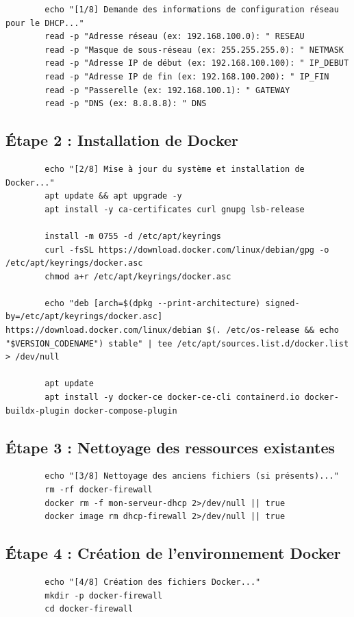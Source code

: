 	\begin{lstlisting}
		echo "[1/8] Demande des informations de configuration réseau pour le DHCP..."
		read -p "Adresse réseau (ex: 192.168.100.0): " RESEAU
		read -p "Masque de sous-réseau (ex: 255.255.255.0): " NETMASK
		read -p "Adresse IP de début (ex: 192.168.100.100): " IP_DEBUT
		read -p "Adresse IP de fin (ex: 192.168.100.200): " IP_FIN
		read -p "Passerelle (ex: 192.168.100.1): " GATEWAY
		read -p "DNS (ex: 8.8.8.8): " DNS
	\end{lstlisting}
	
	\subsection*{Étape 2 : Installation de Docker}
	\begin{lstlisting}
		echo "[2/8] Mise à jour du système et installation de Docker..."
		apt update && apt upgrade -y
		apt install -y ca-certificates curl gnupg lsb-release
		
		install -m 0755 -d /etc/apt/keyrings
		curl -fsSL https://download.docker.com/linux/debian/gpg -o /etc/apt/keyrings/docker.asc
		chmod a+r /etc/apt/keyrings/docker.asc
		
		echo "deb [arch=$(dpkg --print-architecture) signed-by=/etc/apt/keyrings/docker.asc] https://download.docker.com/linux/debian $(. /etc/os-release && echo "$VERSION_CODENAME") stable" | tee /etc/apt/sources.list.d/docker.list > /dev/null
		
		apt update
		apt install -y docker-ce docker-ce-cli containerd.io docker-buildx-plugin docker-compose-plugin
	\end{lstlisting}
	
	\subsection*{Étape 3 : Nettoyage des ressources existantes}
	\begin{lstlisting}
		echo "[3/8] Nettoyage des anciens fichiers (si présents)..."
		rm -rf docker-firewall
		docker rm -f mon-serveur-dhcp 2>/dev/null || true
		docker image rm dhcp-firewall 2>/dev/null || true
	\end{lstlisting}
	
	\subsection*{Étape 4 : Création de l’environnement Docker}
	\begin{lstlisting}
		echo "[4/8] Création des fichiers Docker..."
		mkdir -p docker-firewall
		cd docker-firewall
	\end{lstlisting}
	
